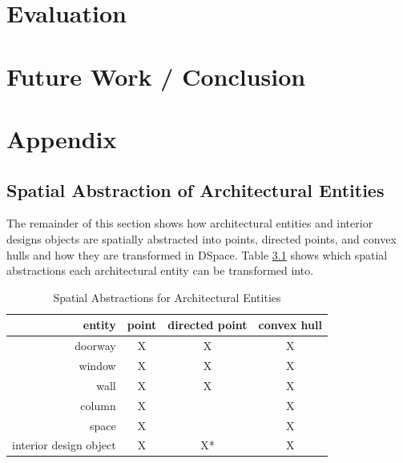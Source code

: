 \documentclass[12pt]{ucthesis}
\begin{document}




\chapter{Evaluation}


\chapter{Future Work / Conclusion}

\appendix
\chapter{Appendix}
\section{Spatial Abstraction of Architectural Entities} \label{spatial abstraction}
The remainder of this section shows how architectural entities and interior designs objects are spatially abstracted into points, directed points, and convex hulls and how they are transformed in DSpace. Table \ref{spatial abstractions} shows which spatial abstractions each architectural entity can be transformed into. 

\begin{table}[H]
  \begin{center}
  \begin{tabular}{ | r | c | c | c |}
    \hline
    entity & point & directed point & convex hull\\ \hline
    doorway & X & X & X \\ \hline
    window & X & X & X \\ \hline
    wall & X & X & X \\ \hline
    column & X &  & X \\ \hline
    space & X &  & X \\ \hline
    interior design object & X & X* & X \\
    \hline
  \end{tabular}
  \end{center}
\caption{Spatial Abstractions for Architectural Entities}
\label{spatial abstractions}
\end{table} 
\end{document}
